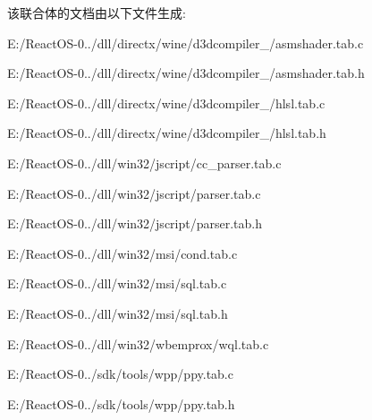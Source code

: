 该联合体的文档由以下文件生成\+:\begin{DoxyCompactItemize}
\item 
E\+:/\+React\+O\+S-\/0../dll/directx/wine/d3dcompiler\+\_/asmshader.\+tab.\+c\item 
E\+:/\+React\+O\+S-\/0../dll/directx/wine/d3dcompiler\+\_/asmshader.\+tab.\+h\item 
E\+:/\+React\+O\+S-\/0../dll/directx/wine/d3dcompiler\+\_/hlsl.\+tab.\+c\item 
E\+:/\+React\+O\+S-\/0../dll/directx/wine/d3dcompiler\+\_/hlsl.\+tab.\+h\item 
E\+:/\+React\+O\+S-\/0../dll/win32/jscript/cc\+\_\+parser.\+tab.\+c\item 
E\+:/\+React\+O\+S-\/0../dll/win32/jscript/parser.\+tab.\+c\item 
E\+:/\+React\+O\+S-\/0../dll/win32/jscript/parser.\+tab.\+h\item 
E\+:/\+React\+O\+S-\/0../dll/win32/msi/cond.\+tab.\+c\item 
E\+:/\+React\+O\+S-\/0../dll/win32/msi/sql.\+tab.\+c\item 
E\+:/\+React\+O\+S-\/0../dll/win32/msi/sql.\+tab.\+h\item 
E\+:/\+React\+O\+S-\/0../dll/win32/wbemprox/wql.\+tab.\+c\item 
E\+:/\+React\+O\+S-\/0../sdk/tools/wpp/ppy.\+tab.\+c\item 
E\+:/\+React\+O\+S-\/0../sdk/tools/wpp/ppy.\+tab.\+h\end{DoxyCompactItemize}

